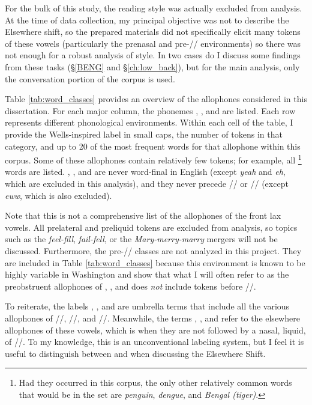 For the bulk of this study, the reading style was actually excluded from analysis. At the time of data collection, my principal objective was not to describe the Elsewhere shift, so the prepared materials did not specifically elicit many tokens of these vowels (particularly the prenasal and pre-// environments) so there was not enough for a robust analysis of style. In two cases do I discuss some findings from these tasks (\S\ref{BENG} and \S\ref{ch:low_back}), but for the main analysis, only the conversation portion of the corpus is used.



Table \ref{tab:word_classes} provides an overview of the allophones considered in this dissertation. For each major column, the phonemes \trap, \dress, and \kit are listed. Each row represents different phonological environments. Within each cell of the table, I provide the Wells-inspired label in small caps, the number of tokens in that category, and up to 20 of the most frequent words for that allophone within this corpus. Some of these allophones contain relatively few tokens; for example, all \beng\footnote{Had they occurred in this corpus, the only other relatively common words that would be in the \beng set are \textit{penguin}, \textit{dengue}, and \textit{Bengal (tiger)}.} words are listed. \trap, \dress, and \kit are never word-final in English (except \textit{yeah} and \textit{eh}, which are excluded in this analysis), and they never precede // or // (except \textit{eww}, which is also excluded).

Note that this is not a comprehensive list of the allophones of the front lax vowels. All prelateral and preliquid tokens are excluded from analysis, so topics such as the \textit{feel-fill}, \textit{fail-fell}, or the \textit{Mary-merry-marry} mergers will not be discussed. Furthermore, the pre-// classes are not analyzed in this project. They are included in Table \ref{tab:word_classes} because this environment is known to be highly variable in Washington \citep{wassink_etal_2009, wassink_2015, wassink_2016_pads, stanley_2017_ADS} and show that what I will often refer to as the preobstruent allophones of \trap, \dress, and \kit does \textit{not} include tokens before //.

To reiterate, the labels \trap, \dress, and \kit are umbrella terms that include all the various allophones of /\textipa{\ae}/, //, and //. Meanwhile, the terms \bat, \bet, and \bit refer to the elsewhere allophones of these vowels, which is when they are not followed by a nasal, liquid, of //. To my knowledge, this is an unconventional labeling system, but I feel it is useful to distinguish between \trap and \bat when discussing the Elsewhere Shift.


